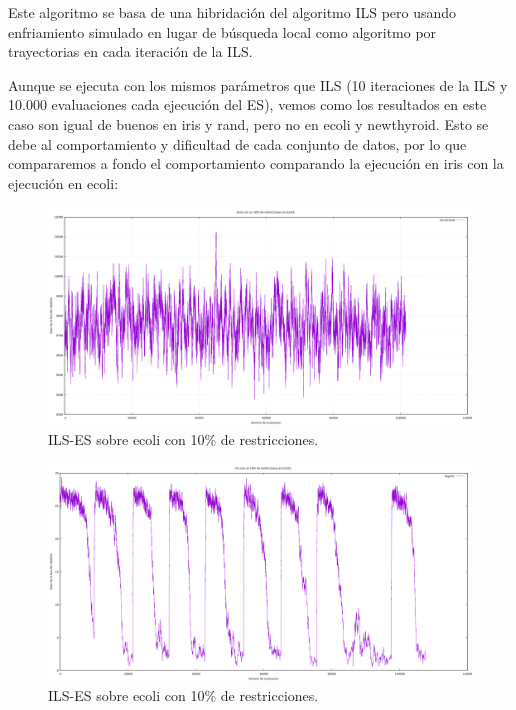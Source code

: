 \documentclass[12pt, spanish]{article}
\begin{document}
Este algoritmo se basa de una hibridación del algoritmo ILS pero usando enfriamiento simulado en lugar de búsqueda local como algoritmo por trayectorias en cada iteración de la ILS. 

Aunque se ejecuta con los mismos parámetros que ILS (10 iteraciones de la ILS y 10.000 evaluaciones cada ejecución del ES), vemos como los resultados en este caso son igual de buenos en iris y rand, pero no en ecoli y newthyroid. Esto se debe al comportamiento y dificultad de cada conjunto de datos, por lo que compararemos a fondo el comportamiento comparando la ejecución en iris con la ejecución en ecoli:


\begin{figure}[H]
	\centering
	\includegraphics[scale = 0.35]{ecoli-ils-es.png}
	
	\caption{ILS-ES sobre ecoli con 10\% de restricciones.}
	\label{fig:es-cmp2}
\end{figure}

\begin{figure}[H]
	\centering
	\includegraphics[scale = 0.35]{iris-ils-es.png}
	
	\caption{ILS-ES sobre ecoli con 10\% de restricciones.}
	\label{fig:es-cmp1}
\end{figure}
\end{document}
